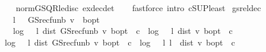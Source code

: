 \begin{isabellebody}
%
\isadelimproof
\ \ %
\endisadelimproof
%
\isatagproof
{}\isamarkupfalse%
\ norm{\isacharunderscore}{\kern0pt}GS{\isacharunderscore}{\kern0pt}QR{\isacharunderscore}{\kern0pt}le{\isacharunderscore}{\kern0pt}disc\ ex{\isacharunderscore}{\kern0pt}dec{\isacharunderscore}{\kern0pt}det\isanewline
\ \ \isamarkupfalse%
\ {\isacharparenleft}{\kern0pt}fastforce\ intro{\isacharbang}{\kern0pt}{\isacharcolon}{\kern0pt}\ cSUP{\isacharunderscore}{\kern0pt}least{\isacharparenright}{\kern0pt}%
\endisatagproof
{\isafoldproof}%
%
\isadelimproof
\isanewline
%
\endisadelimproof
\isanewline
{}\isamarkupfalse%
\ gs{\isacharunderscore}{\kern0pt}rel{\isacharunderscore}{\kern0pt}dec{\isacharcolon}{\kern0pt}\ \isanewline
\ \ \ {\isachardoublequoteopen}l\ {\isasymnoteq}\ {}{\isachardoublequoteclose}\ {\isachardoublequoteopen}GS{\isacharunderscore}{\kern0pt}rec{\isacharunderscore}{\kern0pt}fun\isactrlsub b\ v\ {\isasymnoteq}\ {\isasymnu}\isactrlsub b{\isacharunderscore}{\kern0pt}opt{\isachardoublequoteclose}\isanewline
\ \ \ {\isachardoublequoteopen}{\isasymlceil}log\ {\isacharparenleft}{\kern0pt}{}\ {\isacharslash}{\kern0pt}\ l{\isacharparenright}{\kern0pt}\ {\isacharparenleft}{\kern0pt}dist\ {\isacharparenleft}{\kern0pt}GS{\isacharunderscore}{\kern0pt}rec{\isacharunderscore}{\kern0pt}fun\isactrlsub b\ v{\isacharparenright}{\kern0pt}\ {\isasymnu}\isactrlsub b{\isacharunderscore}{\kern0pt}opt{\isacharparenright}{\kern0pt}\ {\isacharminus}{\kern0pt}\ c{\isasymrceil}\ {\isacharless}{\kern0pt}\ {\isasymlceil}log\ {\isacharparenleft}{\kern0pt}{}\ {\isacharslash}{\kern0pt}\ l{\isacharparenright}{\kern0pt}\ {\isacharparenleft}{\kern0pt}dist\ v\ {\isasymnu}\isactrlsub b{\isacharunderscore}{\kern0pt}opt{\isacharparenright}{\kern0pt}\ {\isacharminus}{\kern0pt}\ c{\isasymrceil}{\isachardoublequoteclose}\isanewline
%
\isadelimproof
%
\endisadelimproof
%
\isatagproof
{}\isamarkupfalse%
\ {\isacharminus}{\kern0pt}\isanewline
\ \ \isamarkupfalse%
\ {\isachardoublequoteopen}log\ {\isacharparenleft}{\kern0pt}{}\ {\isacharslash}{\kern0pt}\ l{\isacharparenright}{\kern0pt}\ {\isacharparenleft}{\kern0pt}dist\ {\isacharparenleft}{\kern0pt}GS{\isacharunderscore}{\kern0pt}rec{\isacharunderscore}{\kern0pt}fun\isactrlsub b\ v{\isacharparenright}{\kern0pt}\ {\isasymnu}\isactrlsub b{\isacharunderscore}{\kern0pt}opt{\isacharparenright}{\kern0pt}\ {\isacharminus}{\kern0pt}\ c\ {\isasymle}\ log\ {\isacharparenleft}{\kern0pt}{}\ {\isacharslash}{\kern0pt}\ l{\isacharparenright}{\kern0pt}\ {\isacharparenleft}{\kern0pt}l\ {\isacharasterisk}{\kern0pt}\ dist\ v\ {\isasymnu}\isactrlsub b{\isacharunderscore}{\kern0pt}opt{\isacharparenright}{\kern0pt}\ {\isacharminus}{\kern0pt}\ c{\isachardoublequoteclose}\isanewline

\end{isabellebody}
